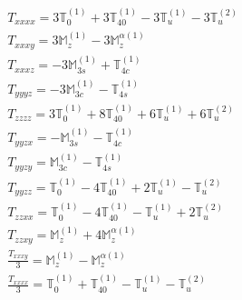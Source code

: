 \documentclass[fleqn,8pt,landscape]{jsarticle}
\begin{document}
\begin{align*}
& T_{xxxx} = 3 \mathbb{T}_{0}^{(1)} + 3 \mathbb{T}_{40}^{(1)} - 3 \mathbb{T}_{u}^{(1)} - 3 \mathbb{T}_{u}^{(2)} \\
& T_{xxxy} = 3 \mathbb{M}_{z}^{(1)} - 3 \mathbb{M}_{z}^{\alpha(1)} \\
& T_{xxxz} = - 3 \mathbb{M}_{3s}^{(1)} + \mathbb{T}_{4c}^{(1)} \\
& T_{yyyz} = - 3 \mathbb{M}_{3c}^{(1)} - \mathbb{T}_{4s}^{(1)} \\
& T_{zzzz} = 3 \mathbb{T}_{0}^{(1)} + 8 \mathbb{T}_{40}^{(1)} + 6 \mathbb{T}_{u}^{(1)} + 6 \mathbb{T}_{u}^{(2)} \\
& T_{yyzx} = - \mathbb{M}_{3s}^{(1)} - \mathbb{T}_{4c}^{(1)} \\
& T_{yyzy} = \mathbb{M}_{3c}^{(1)} - \mathbb{T}_{4s}^{(1)} \\
& T_{yyzz} = \mathbb{T}_{0}^{(1)} - 4 \mathbb{T}_{40}^{(1)} + 2 \mathbb{T}_{u}^{(1)} - \mathbb{T}_{u}^{(2)} \\
& T_{zzxx} = \mathbb{T}_{0}^{(1)} - 4 \mathbb{T}_{40}^{(1)} - \mathbb{T}_{u}^{(1)} + 2 \mathbb{T}_{u}^{(2)} \\
& T_{zzxy} = \mathbb{M}_{z}^{(1)} + 4 \mathbb{M}_{z}^{\alpha(1)} \\
& \frac{T_{xxxy}}{3} = \mathbb{M}_{z}^{(1)} - \mathbb{M}_{z}^{\alpha(1)} \\
& \frac{T_{xxxx}}{3} = \mathbb{T}_{0}^{(1)} + \mathbb{T}_{40}^{(1)} - \mathbb{T}_{u}^{(1)} - \mathbb{T}_{u}^{(2)}
\end{align*}
\end{document}
